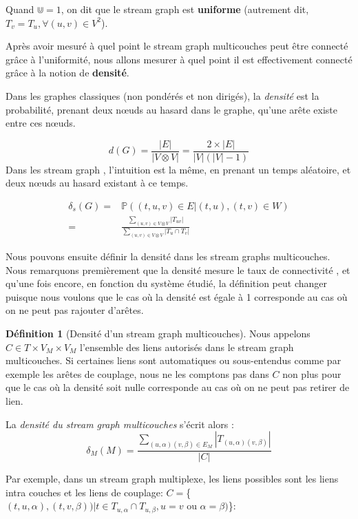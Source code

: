 \documentclass[11pt,a4paper]{article}
\theoremstyle{definition}
\newtheorem{defn}{Définition}
\theoremstyle{remark}
\theoremstyle{remark}
\def \stg {stream graph}
\def \stgm {stream graph multicouches}
\def \stgms {stream graphs multicouches}
\begin{document}
	Quand $\Cup=1$, on dit que le \stg{} est \textbf{uniforme} (autrement dit, $T_v = T_u, \forall (u,v) \in V^2$).


    Après avoir mesuré \og à quel point le \stgm{} peut être connecté\fg{} grâce à l'uniformité, nous allons mesurer à quel point il est effectivement connecté grâce à la notion de \textbf{densité}.
    
    Dans les graphes classiques (non pondérés et non dirigés), la {\em densité} est la probabilité, prenant deux n\oe{}uds au hasard dans le graphe, qu'une arête existe entre ces n\oe{}uds.
    
		\[
			d(G) = \frac{|E|}{|V\otimes V|} = \frac{2\times |E|}{|V|(|V|-1)}
		\]
	Dans les \stg{} \cite{stream}, l'intuition est la même, en prenant un temps aléatoire, et deux n\oe{}uds au hasard existant à ce temps. 	

		\begin{align*}
			\delta_s(G) = & \mathbb{P}((t,u,v)\in E| (t,u),(t,v) \in W) \\
			 =  & \frac{\sum_{(u,v) \in V \otimes V}{|T_{uv}|}}{\sum_{(u,v) \in V\otimes V}{|T_u\cap T_v|}}
		\end{align*}
		
	Nous pouvons ensuite définir la densité dans les \stgms{}. Nous remarquons premièrement que la densité mesure le \og taux de connectivité \fg{}, et qu'une fois encore, en fonction du système étudié, la définition peut changer puisque nous voulons que le cas où la densité est égale à 1 corresponde au cas où on ne peut pas rajouter d'arêtes. 

\begin{defn}[Densité d'un \stgm{}]	
	Nous appelons  $C \in T \times V_M\times V_M$ l'ensemble des liens autorisés dans le \stgm{}. Si certaines liens sont \og automatiques\fg{} ou \og sous-entendus \fg{} comme par exemple les arêtes de couplage, nous ne les comptons pas dans $C$ non plus pour que le cas où la densité soit nulle corresponde au cas où on ne peut pas retirer de lien.

	La {\em densité du \stgm{}} s'écrit alors : 
	\[
		\delta_M (M) 
		= \frac{\sum_{(u,\alpha)(v,\beta) \in E_M}|T_{(u,\alpha)(v,\beta)}|}{|C|}
	\]
\end{defn}	
	
	Par exemple, dans un \stg{} multiplexe, les liens possibles sont les liens intra couches et les liens de couplage: $C=${\Large \{}$(t,u,\alpha),(t,v,\beta))| t\in T_{u,\alpha} \cap T_{u,\beta}, u=v \text{ ou } \alpha = \beta)${\Large \}}:
\end{document}
